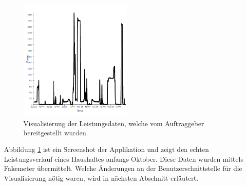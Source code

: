 \begin{figure}
    \centering
    \includegraphics[width=0.5\textwidth]{gfx/markusData}
    \caption{
        Visualisierung der Leistungsdaten, welche vom Auftraggeber bereitgestellt wurden
    }
    \label{fig:markusData}
\end{figure}
Abbildung \ref{fig:markusData} ist ein Screenshot der Applikation und zeigt den
echten Leistungsverlauf eines Haushaltes anfangs Oktober.
Diese Daten wurden mittels Fakemeter übermittelt.
Welche Änderungen an der Benutzerschnittstelle für die Visualisierung nötig waren,
wird in nächsten Abschnitt erläutert.



